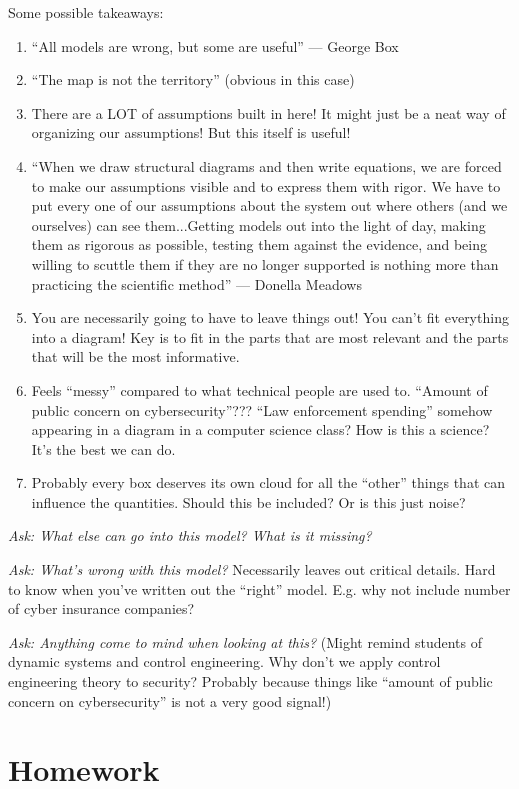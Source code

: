 \documentclass[11pt]{article}
\begin{document}
Some possible takeaways:
\begin{enumerate}
    \item ``All models are wrong, but some are useful'' --- George Box
    \item ``The map is not the territory'' (obvious in this case)
    \item There are a LOT of assumptions built in here! It might just be a neat way of organizing our assumptions! But this itself is useful!
    \item ``When we draw structural diagrams and then write equations, we are forced
    to make our assumptions visible and to express them with rigor. We have
    to put every one of our assumptions about the system out where others
    (and we ourselves) can see them...Getting models out into the light of day, making them as rigorous as possible, testing them against the evidence, and being willing to scuttle
    them if they are no longer supported is nothing more than practicing the
    scientific method'' --- Donella Meadows
    \item You are necessarily going to have to leave things out! You can't fit everything into a diagram! Key is to fit in the parts that are most relevant and the parts that will be the most informative.
    \item Feels ``messy'' compared to what technical people are used to. ``Amount of public concern on cybersecurity''??? ``Law enforcement spending'' somehow appearing in a diagram in a computer science class? How is this a science? It's the best we can do.
    \item Probably every box deserves its own cloud for all the ``other'' things that can influence the quantities. Should this be included? Or is this just noise?
\end{enumerate}

{\it Ask: What else can go into this model? What is it missing?}

{\it Ask: What's wrong with this model?} Necessarily leaves out critical details. Hard to know when you've written out the ``right'' model. E.g. why not include number of cyber insurance companies?

{\it Ask: Anything come to mind when looking at this?} (Might remind students of dynamic systems and control engineering. Why don't we apply control engineering theory to security? Probably because things like ``amount of public concern on cybersecurity'' is not a very good signal!)

\section{Homework}
\end{document}
